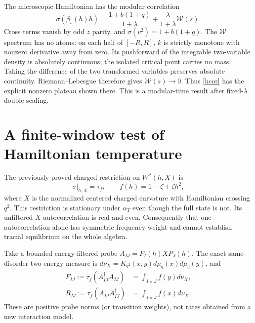 \documentclass[11pt]{article}
\begin{document}
The microscopic Hamiltonian has the modular correlation
\begin{equation}\label{hcor}
 \sigma(\beta_s(h)h)=
 \frac{1+b(1+q)}{1+\lambda}
       +\frac{\lambda}{1+\lambda}\mathcal W(s).
\end{equation}
Cross terms vanish by odd $z$ parity, and
$\sigma(v^2)=1+b(1+q)$. The $\mathcal W$ spectrum has no atoms:
on each half of $[-R,R]$, $k$ is strictly monotone with nonzero
derivative away from zero. Its pushforward of the integrable
two-variable density is absolutely continuous; the isolated
critical point carries no mass. Taking the difference of the
two transformed variables preserves absolute continuity.
Riemann--Lebesgue therefore gives $\mathcal W(s)\to0$.
Thus \eqref{hcor} has the explicit nonzero plateau shown there.
This is a modular-time result after fixed-$\lambda$ double scaling.

\newpage
\section{A finite-window test of Hamiltonian temperature}
The previously proved charged restriction on $W^*(h,X)$ is
\[
 \sigma|_{h,X}=\tau_f,\qquad
 f(h)=1-\zeta+\zeta h^2,
\]
where $X$ is the normalized centered charged curvature with
Hamiltonian crossing $q^2$. This restriction is stationary under
$\alpha_T$ even though the full state is not.
Its unfiltered $X$ autocorrelation is real and even. Consequently
that one autocorrelation alone has symmetric frequency weight
and cannot establish tracial equilibrium on the whole algebra.

Take a bounded energy-filtered probe
$A_{IJ}=P_I(h)XP_J(h)$. The exact same-disorder two-energy
measure is $d\nu_X=K_{q^2}(x,y)d\mu_q(x)d\mu_q(y)$, and
\begin{align}\label{rates}
 F_{IJ}:=\tau_f(A_{IJ}^\dagger A_{IJ})
  &=\int_{I\times J}f(y)d\nu_X,\\
 R_{IJ}:=\tau_f(A_{IJ}A_{IJ}^\dagger)
  &=\int_{I\times J}f(x)d\nu_X.
\end{align}
These are positive probe norms (or transition weights), not
rates obtained from a new interaction model.
\end{document}
